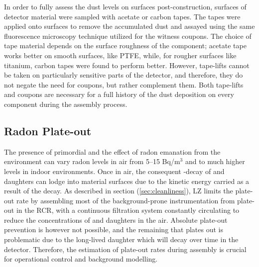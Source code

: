 In order to fully assess the dust levels on surfaces post-construction, surfaces of detector material were sampled with acetate or carbon tapes. The tapes were applied onto surfaces to remove the accumulated dust and assayed using the same fluorescence microscopy technique utilized for the witness coupons. The choice of tape material depends on the surface roughness of the component; acetate tape works better on smooth surfaces, like PTFE, while, for rougher surfaces like titanium, carbon tapes were found to perform better. However, tape-lifts cannot be taken on particularly sensitive parts of the detector, and therefore, they do not negate the need for coupons, but rather complement them. Both tape-lifts and coupons are necessary for a full history of the dust deposition on every component during the assembly process. 


\subsection{Radon Plate-out}
\label{secsec:radon_plateout}

The presence of primordial \UTTE{} and the effect of radon emanation from the environment can vary radon levels in air from 5--15 Bq/m$^3$ and to much higher levels in indoor environments. Once in air, the consequent \alpha-decay of \RnTTT{} and daughters can lodge into material surfaces due to the kinetic energy carried as a result of the decay. As described in section (\ref{sec:cleanliness}), LZ limits the plate-out rate by assembling most of the background-prone instrumentation from plate-out in the RCR, with a continuous filtration system constantly circulating to reduce the concentrations of \RnTTT{} and daughters in the air. Absolute plate-out prevention is however not possible, and the remaining \PoTOE{} that plates out is problematic due to the long-lived \PbTOZ{} daughter which will decay over time in the detector. Therefore, the estimation of plate-out rates during assembly is crucial for operational control and background modelling.


